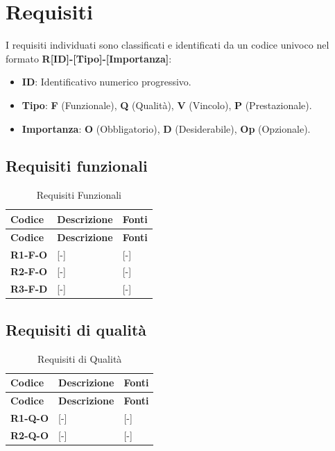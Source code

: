 \section{Requisiti}
I requisiti individuati sono classificati e identificati da un codice univoco nel formato \textbf{R[ID]-[Tipo]-[Importanza]}:
\begin{itemize}
	\item \textbf{ID}: Identificativo numerico progressivo.
	\item \textbf{Tipo}: \textbf{F} (Funzionale), \textbf{Q} (Qualità), \textbf{V} (Vincolo), \textbf{P} (Prestazionale).
	\item \textbf{Importanza}: \textbf{O} (Obbligatorio), \textbf{D} (Desiderabile), \textbf{Op} (Opzionale).
\end{itemize}

\subsection{Requisiti funzionali}
\renewcommand{\arraystretch}{1.5}
\begin{longtable}{|p{2.5cm}|p{8.5cm}|p{3.5cm}|}
	\caption{Requisiti Funzionali} \\
	\hline
	\rowcolor{primarycolor!10}
	\textbf{Codice} & \textbf{Descrizione} & \textbf{Fonti} \\
	\hline
	\endfirsthead
	
	\hline
	\rowcolor{primarycolor!10}
	\textbf{Codice} & \textbf{Descrizione} & \textbf{Fonti} \\
	\hline
	\endhead
	
	\textbf{R1-F-O} & [-] & [-] \\ \hline
	\textbf{R2-F-O} & [-] & [-] \\ \hline
	\textbf{R3-F-D} & [-] & [-] \\ \hline
	
\end{longtable}

\subsection{Requisiti di qualità}
\begin{longtable}{|p{2.5cm}|p{8.5cm}|p{3.5cm}|}
	\caption{Requisiti di Qualità} \\
	\hline
	\rowcolor{primarycolor!10}
	\textbf{Codice} & \textbf{Descrizione} & \textbf{Fonti} \\
	\hline
	\endfirsthead
	
	\hline
	\rowcolor{primarycolor!10}
	\textbf{Codice} & \textbf{Descrizione} & \textbf{Fonti} \\
	\hline
	\endhead
	
	\textbf{R1-Q-O} & [-] & [-] \\ \hline
	\textbf{R2-Q-O} & [-] & [-] \\ \hline
\end{longtable}

